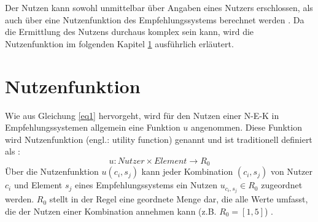 Der Nutzen kann sowohl unmittelbar über Angaben eines Nutzers erschlossen, als auch über eine Nutzenfunktion des Empfehlungssystems berechnet werden \cite[S. 735]{adomavicius:inproceedings}.
Da die Ermittlung des Nutzens durchaus komplex sein kann, wird die Nutzenfunktion im folgenden Kapitel \ref{ch:empfehlungssysteme:nutzenfunktion} ausführlich erläutert.

\section{Nutzenfunktion}
\label{ch:empfehlungssysteme:nutzenfunktion}
Wie aus Gleichung \ref{eq1} hervorgeht, wird für den Nutzen einer \ac{N-E-K} in Empfehlungssystemen allgemein eine Funktion $u$ angenommen.
Diese Funktion wird Nutzenfunktion (engl.: utility function) genannt und ist traditionell definiert als \cite[S. 195]{adomavicius:3:inbook}\cite[S. 3]{jawaheer:article}\cite[S. 1156]{gupta:inproceedings}\cite[S. 219]{lakiotaki:inproceedings}\cite[S. 3880]{nilashi:article}:
\begin{equation}\label{eq2}%
    u: Nutzer \times Element \rightarrow R_{0}
\end{equation}
Über die Nutzenfunktion $u(c_{i},s_{j})$ kann jeder Kombination $(c_{i},s_{j})$ von Nutzer $c_{i}$ und Element $s_{j}$ eines Empfehlungssystems ein Nutzen $u_{c_{i},s_{j}} \in R_{0}$ zugeordnet werden.
$R_{0}$ stellt in der Regel eine geordnete Menge dar, die alle Werte umfasst, die der Nutzen einer Kombination annehmen kann (z.B. $R_{0} = [1,5]$) \cite[S. 49]{adomavicius:inproceedings:2}.

